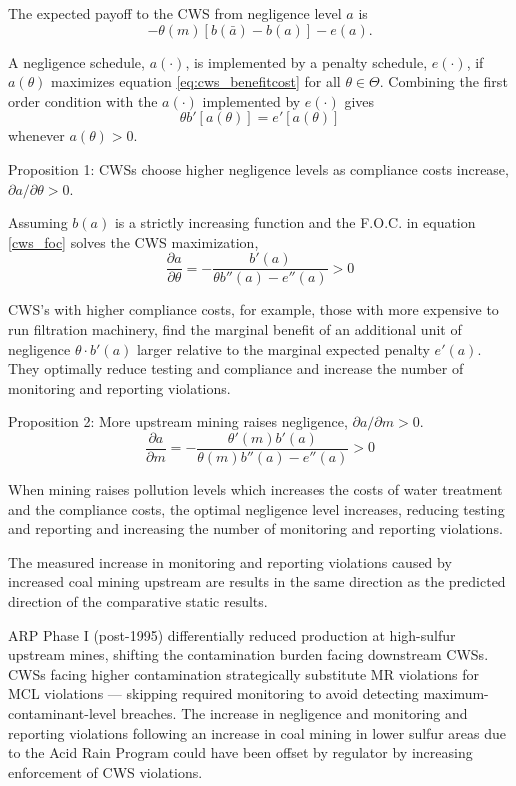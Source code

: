 \documentclass{article}
\begin{document}
The expected payoff to the CWS from negligence level $a$ is
\begin{equation}\label{eq:cws_benefitcost}
    -\theta(m)[b(\bar{a})-b(a)]-e(a).
\end{equation}

A negligence schedule, $a(\cdot)$, is implemented by a penalty schedule, $e(\cdot)$, if $a(\theta)$ maximizes equation \ref{eq:cws_benefitcost} for all $\theta \in \Theta$. Combining the first order condition with the $a(\cdot)$ implemented by $e(\cdot)$ gives
\begin{equation}\label{cws_foc}
    \theta b'[a(\theta)]=e'[a(\theta)]
\end{equation}
whenever $a(\theta)>0$.

Proposition 1: CWSs choose higher negligence levels as compliance costs increase, $\partial a/ \partial \theta>0$.

Assuming $b(a)$ is a strictly increasing function and the F.O.C. in equation \ref{cws_foc} solves the CWS maximization,
\[\frac{\partial a}{\partial \theta}=-\frac{b'(a)}{\theta b''(a)-e''(a)}>0\]

CWS's with higher compliance costs, for example, those with more expensive to run filtration machinery, find the marginal benefit of an additional unit of negligence $\theta·b'(a)$ larger relative to the marginal expected penalty $e'(a)$. They optimally reduce testing and compliance and increase the number of monitoring and reporting violations.

Proposition 2: More upstream mining raises negligence, $\partial a/\partial m >0$.
\[\frac{\partial a}{\partial m}=-\frac{\theta'(m)b'(a)}{\theta(m) b''(a)-e''(a)}>0\]

When mining raises pollution levels which increases the costs of water treatment and the compliance costs, the optimal negligence level increases, reducing testing and reporting and increasing the number of monitoring and reporting violations.

The measured increase in monitoring and reporting violations caused by increased coal mining upstream are results in the same direction as the predicted direction of the comparative static results. 

ARP Phase I (post-1995) differentially reduced production at high-sulfur upstream mines, shifting the contamination burden facing downstream CWSs. CWSs facing higher contamination strategically substitute MR violations for MCL violations — skipping required monitoring to avoid detecting maximum-contaminant-level breaches. The increase in negligence and monitoring and reporting violations following an increase in coal mining in lower sulfur areas due to the Acid Rain Program could have been offset by regulator by increasing enforcement of CWS violations.
\end{document}
